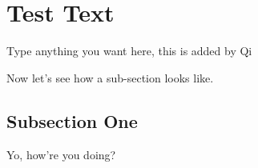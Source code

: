 
\section{Test Text}
\label{sec:text}


Type anything you want here, this is added by Qi

Now let's see how a sub-section looks like.

\subsection{Subsection One}

Yo, how're you doing?



 


